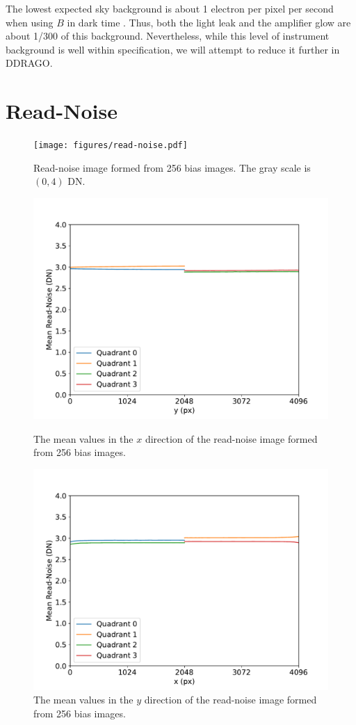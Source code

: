\documentclass{article}
\begin{document}
The lowest expected sky background is about 1 electron per pixel per second when using $B$ in dark time \cite{expected}. Thus, both the light leak and the amplifier glow are about 1/300 of this background. Nevertheless, while this level of instrument background is well within specification, we will attempt to reduce it further in DDRAGO.

\clearpage
\section{Read-Noise}

\begin{figure}[pb]
\begin{center}
\texttt{[image: figures/read-noise.pdf]}
\medskip
\caption{Read-noise image formed from 256 bias images. The gray scale is $(0,4)$ DN.}
\label{figure:read-noise}
\end{center}
\end{figure}

\begin{figure}[pb]
\begin{center}
\includegraphics[width=0.7\columnwidth]{figures/read-noise-y.pdf}
\medskip
\caption{The mean values in the $x$ direction of the read-noise image formed from 256 bias images.}
\label{figure:read-noise-y}
\end{center}
\begin{center}
\includegraphics[width=0.7\columnwidth]{figures/read-noise-x.pdf}
\medskip
\caption{The mean values in the $y$ direction of the read-noise image formed from 256 bias images.}
\label{figure:read-noise-x}
\end{center}
\end{figure}
\end{document}
